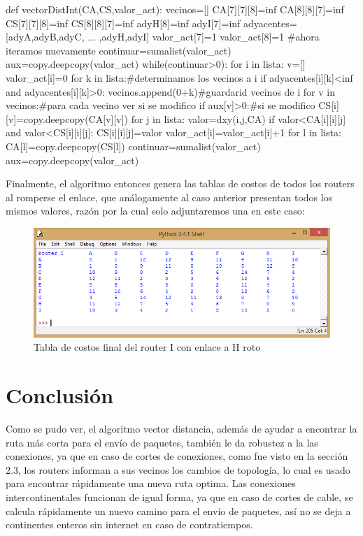 \documentclass{article}
\begin{document}
\begin{python}
def vectorDistInt(CA,CS,valor_act):
    vecinos=[]
    CA[7][7][8]=inf
    CA[8][8][7]=inf
    CS[7][7][8]=inf
    CS[8][8][7]=inf
    adyH[8]=inf
    adyI[7]=inf
    adyacentes=[adyA,adyB,adyC, ... ,adyH,adyI]
    valor_act[7]=1
    valor_act[8]=1
    #ahora iteramos nuevamente
    continuar=sumalist(valor_act)
    aux=copy.deepcopy(valor_act)
    while(continuar>0):
        for i in lista:
            v=[]
            valor_act[i]=0
            for k in lista:#determinamos los vecinos a i
                if adyacentes[i][k]<inf and adyacentes[i][k]>0:
                    vecinos.append(0+k)#guardarid vecinos de i
            for v in vecinos:#para cada vecino ver si se modifico
                if aux[v]>0:#si se modifico
                    CS[i][v]=copy.deepcopy(CA[v][v])
                    for j in lista:
                        valor=dxy(i,j,CA)
                        if valor<CA[i][i][j] and valor<CS[i][i][j]:
                            CS[i][i][j]=valor
                            valor_act[i]=valor_act[i]+1
        for l in lista:
            CA[l]=copy.deepcopy(CS[l])
        continuar=sumalist(valor_act)
        aux=copy.deepcopy(valor_act)

\end{python}

Finalmente, el algoritmo entonces genera las tablas de costos de todos los routers al romperse el enlace, que análogamente al caso anterior presentan todos los mismos valores, razón por la cual solo adjuntaremos una en este caso:

\begin{figure}[H]
\centering
\includegraphics[width=\textwidth]{p31.png}
\caption{Tabla de costos final del router I con enlace a H roto}
\label{fig:Tabla de costos}
\end{figure} 

\section{Conclusión}

Como se pudo ver, el algoritmo vector distancia, además de ayudar a encontrar la ruta más corta para el envío de paquetes, también le da robustez a la las conexiones, ya que en caso de cortes de conexiones, como fue visto en la sección 2.3, los routers informan a sus vecinos los cambios de topología, lo cual es usado para encontrar rápidamente una nueva ruta optima. Las conexiones intercontinentales funcionan de igual forma, ya que en caso de cortes de cable, se calcula rápidamente un nuevo camino para el envío de paquetes, así no se deja a continentes enteros sin internet en caso de contratiempos.


\clearpage

\end{document}
